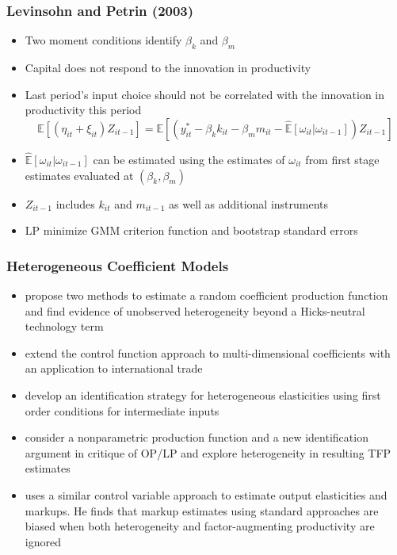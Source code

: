 \documentclass{beamer}
\begin{document}

\begin{frame}
\frametitle{Levinsohn and Petrin (2003)}
\begin{itemize}
	\item Two moment conditions identify $\beta_{k}$ and $\beta_{m}$
	\item Capital does not respond to the innovation in productivity 
	\item Last period's input choice should not be correlated with the innovation in productivity this period
	\begin{equation}
	\mathbb{E}[(\eta_{it}+\xi_{it})Z_{it-1}]=\mathbb{E}[(y_{it}^{*}-\beta_{k}k_{it}-\beta_{m}m_{it}-\hat{\mathbb{E}}[\omega_{it}|\omega_{it-1}])Z_{it-1}]
	\end{equation}
	\item $\hat{\mathbb{E}}[\omega_{it}|\omega_{it-1}]$ can be estimated using the estimates of $\omega_{it}$ from first stage estimates evaluated at $(\beta_{k}, \beta_{m})$
	\item $Z_{it-1}$ includes $k_{it}$ and $m_{it-1}$ as well as additional instruments
	\item LP minimize GMM criterion function and bootstrap standard errors 
\end{itemize}
\end{frame}



\begin{frame}
\frametitle{Heterogeneous Coefficient Models}
\begin{itemize}
	\item \textcite{Kasahara2015} propose two methods to estimate a random coefficient production function and find evidence of unobserved heterogeneity beyond a Hicks-neutral technology term
	\item \textcite{balat} extend the control function approach to multi-dimensional coefficients with an application to international trade
	\item \textcite{Li2017} develop an identification strategy for heterogeneous elasticities using first order conditions for intermediate inputs
	\item \textcite{Gandhi2020} consider a nonparametric production function and a new identification argument in critique of OP/LP and explore heterogeneity in resulting TFP estimates
	\item \textcite{mert} uses a similar control variable approach to estimate output elasticities and markups. He finds that markup estimates using standard approaches are biased when both heterogeneity and factor-augmenting productivity are ignored
\end{itemize}
\end{frame}
\end{document}
